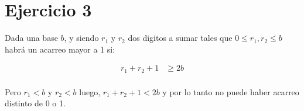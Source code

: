 \section*{Ejercicio 3}

Dada una base $b$, y siendo $r_1$ y $r_2$ dos digitos a sumar tales que $ 0 \leq r_1, r_2 \leq b $ habrá un acarreo mayor a 1 si:

\begin{align*}
    r_1 + r_2 + 1 &\geq 2b \\
\end{align*}

Pero $ r_1 < b $ y $ r_2 < b $ luego, $ r_1 + r_2 + 1 < 2b $ y por lo tanto no puede haber acarreo distinto de 0 o 1.